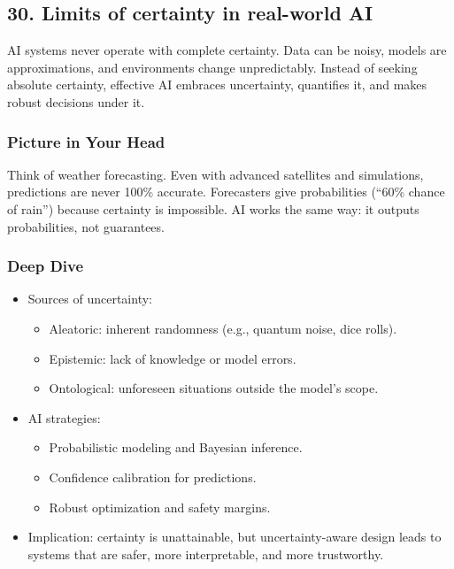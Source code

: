 \documentclass[
  letterpaper,
  DIV=11,
  numbers=noendperiod]{scrreprt}
\providecommand{\tightlist}{%
  \setlength{\itemsep}{0pt}\setlength{\parskip}{0pt}}
\begin{document}
\subsection{30. Limits of certainty in real-world
AI}\label{limits-of-certainty-in-real-world-ai}

AI systems never operate with complete certainty. Data can be noisy,
models are approximations, and environments change unpredictably.
Instead of seeking absolute certainty, effective AI embraces
uncertainty, quantifies it, and makes robust decisions under it.

\subsubsection{Picture in Your Head}\label{picture-in-your-head-29}

Think of weather forecasting. Even with advanced satellites and
simulations, predictions are never 100\% accurate. Forecasters give
probabilities (``60\% chance of rain'') because certainty is impossible.
AI works the same way: it outputs probabilities, not guarantees.

\subsubsection{Deep Dive}\label{deep-dive-29}

\begin{itemize}
\item
  Sources of uncertainty:

  \begin{itemize}
  \tightlist
  \item
    Aleatoric: inherent randomness (e.g., quantum noise, dice rolls).
  \item
    Epistemic: lack of knowledge or model errors.
  \item
    Ontological: unforeseen situations outside the model's scope.
  \end{itemize}
\item
  AI strategies:

  \begin{itemize}
  \tightlist
  \item
    Probabilistic modeling and Bayesian inference.
  \item
    Confidence calibration for predictions.
  \item
    Robust optimization and safety margins.
  \end{itemize}
\item
  Implication: certainty is unattainable, but uncertainty-aware design
  leads to systems that are safer, more interpretable, and more
  trustworthy.
\end{itemize}
\end{document}
